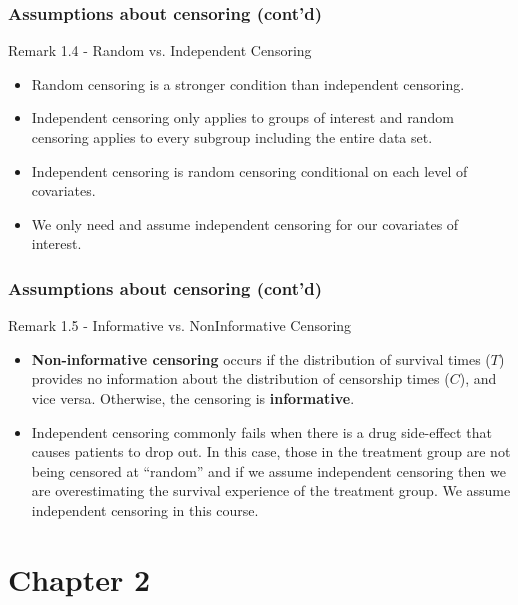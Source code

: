 \documentclass{beamer}
\theoremstyle{definition}
\begin{document}
\begin{frame} 
\frametitle{Assumptions about censoring (cont'd)} 
\begin{block}{Remark 1.4 - Random vs. Independent Censoring} 
\begin{itemize} 
\item Random censoring is a stronger condition than independent censoring. 
\item Independent censoring only applies to groups of interest and random censoring applies to every subgroup including the entire data set. 
\item Independent censoring is random censoring conditional on each level of covariates.
\item We only need and assume independent censoring for our covariates of interest. 
\end{itemize} 
\end{block} 
\end{frame} 


\begin{frame} 
\frametitle{Assumptions about censoring (cont'd)} 
\begin{block}{Remark 1.5 - Informative vs. NonInformative Censoring} 
\begin{itemize} 
\item \textbf{ Non-informative censoring} occurs if the distribution of survival times ($T$) provides no
information about the distribution of censorship times ($C$), and vice versa. Otherwise, the
censoring is \textbf{informative}.
\item Independent censoring commonly fails when there is a drug side-effect that causes patients to drop out. In this case, those in the treatment group are not being censored at ``random'' and if we assume independent censoring then we are overestimating the survival experience of the treatment group. We assume independent censoring in this course.
\end{itemize} 
\end{block} 
\end{frame} 


\section{Chapter 2}
\end{document}
